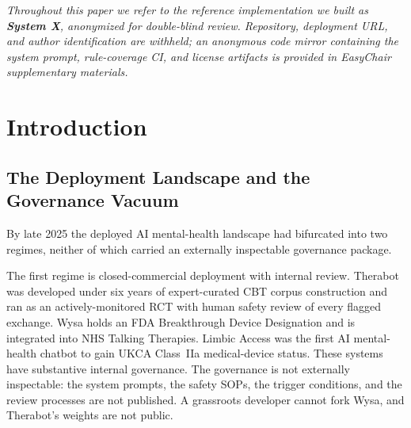\documentclass[letterpaper]{article} %
\begin{document}
\begin{abstract}
We position the package as a \emph{floor}, not a ceiling: minimum viable scaffolding for grassroots deployments that would otherwise ship with no governance, while higher bars (clinical RCT, FDA SaMD pathway, IRB supervision) are pursued in parallel. The paper does not claim the package substitutes for clinical evaluation, regulatory compliance, or operator liability insurance, that the proposed license has been tested in court, that any external party has yet adopted the pattern, or that the rule-coverage CI catches semantic regressions in the registered rules.
\end{abstract}

\noindent\textit{Throughout this paper we refer to the reference implementation we built as \textbf{System X}, anonymized for double-blind review. Repository, deployment URL, and author identification are withheld; an anonymous code mirror containing the system prompt, rule-coverage CI, and license artifacts is provided in EasyChair supplementary materials.}

\section{Introduction}
\label{sec:intro}

\subsection{The Deployment Landscape and the Governance Vacuum}

By late 2025 the deployed AI mental-health landscape had bifurcated into two regimes, neither of which carried an externally inspectable governance package.

The first regime is closed-commercial deployment with internal review. Therabot \citep{heinz2025therabot} was developed under six years of expert-curated CBT corpus construction and ran as an actively-monitored RCT with human safety review of every flagged exchange. Wysa \citep{inkster2018wysa} holds an FDA Breakthrough Device Designation and is integrated into NHS Talking Therapies. Limbic Access \citep{habicht2024limbic} was the first AI mental-health chatbot to gain UKCA Class~IIa medical-device status. These systems have substantive internal governance. The governance is not externally inspectable: the system prompts, the safety SOPs, the trigger conditions, and the review processes are not published. A grassroots developer cannot fork Wysa, and Therabot's weights are not public.
\end{document}
